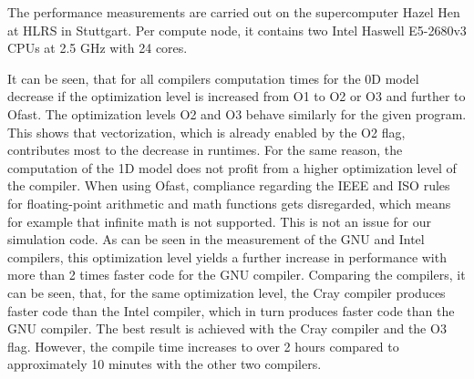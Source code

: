 The performance measurements are carried out on the supercomputer
Hazel Hen at HLRS in Stuttgart. Per compute node, it contains two Intel
Haswell E5-2680v3 CPUs at 2.5 GHz with 24 cores.

It can be seen, that for all compilers computation times for the 0D model
decrease if the optimization level is increased from O1 to O2 or O3 and further
to Ofast. The optimization levels O2 and O3 behave similarly for the given
program. This shows that vectorization, which is already enabled by the O2
flag, contributes most to the decrease in runtimes. For the same reason, the
computation of the 1D model does not profit from a higher optimization level
of the compiler. When using Ofast, compliance regarding the IEEE and ISO
rules for floating-point arithmetic and math functions gets disregarded, which
means for example that infinite math is not supported. This is not an issue
for our simulation code. As can be seen in the measurement of the GNU and
Intel compilers, this optimization level yields a further increase in performance
with more than 2 times faster code for the GNU compiler. Comparing the
compilers, it can be seen, that, for the same optimization level, the Cray
compiler produces faster code than the Intel compiler, which in turn produces
faster code than the GNU compiler. The best result is achieved with the Cray
compiler and the O3 flag. However, the compile time increases to over 2 hours
compared to approximately 10 minutes with the other two compilers.


